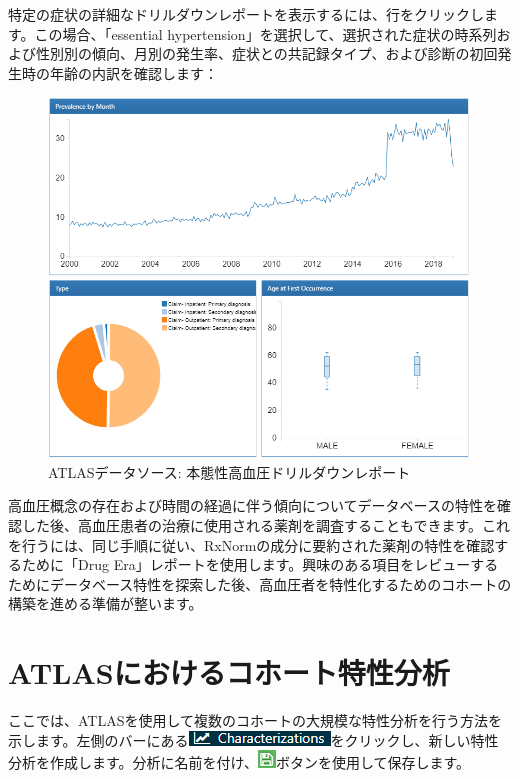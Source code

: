 \documentclass[
  11pt]{book}
\theoremstyle{definition}
\theoremstyle{definition}
\theoremstyle{definition}
\theoremstyle{definition}
\theoremstyle{remark}
\begin{document}
特定の症状の詳細なドリルダウンレポートを表示するには、行をクリックします。この場合、「essential hypertension」を選択して、選択された症状の時系列および性別別の傾向、月別の発生率、症状との共記録タイプ、および診断の初回発生時の年齢の内訳を確認します：

\begin{figure}

{\centering \includegraphics[width=1\linewidth]{images/Characterization/atlasDataSourcesDrillDownReport} 

}

\caption{ATLASデータソース: 本態性高血圧ドリルダウンレポート}\label{fig:atlasDataSourcesDrillDownReport}
\end{figure}

高血圧概念の存在および時間の経過に伴う傾向についてデータベースの特性を確認した後、高血圧患者の治療に使用される薬剤を調査することもできます。これを行うには、同じ手順に従い、RxNormの成分に要約された薬剤の特性を確認するために「Drug Era」レポートを使用します。興味のある項目をレビューするためにデータベース特性を探索した後、高血圧者を特性化するためのコホートの構築を進める準備が整います。

\section{ATLASにおけるコホート特性分析}\label{atlasux306bux304aux3051ux308bux30b3ux30dbux30fcux30c8ux7279ux6027ux5206ux6790}

ここでは、ATLASを使用して複数のコホートの大規模な特性分析を行う方法を示します。左側のバーにある\includegraphics{images/Characterization/atlasCharacterizationMenuItem.png}をクリックし、新しい特性分析を作成します。分析に名前を付け、\includegraphics{images/PopulationLevelEstimation/save.png}ボタンを使用して保存します。
\end{document}

